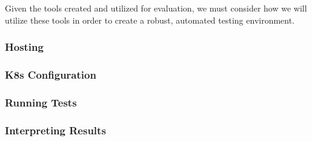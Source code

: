 Given the tools created and utilized for evaluation, we must consider how we
will utilize these tools in order to create a robust, automated testing
environment.

\subsubsection{Hosting}



\subsubsection{K8s Configuration}



\subsubsection{Running Tests}



\subsubsection{Interpreting Results}


